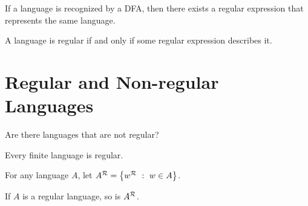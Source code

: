 \documentclass[twoside,letterpaper,openany]{book}
\begin{document}
\begin{lemma}
If a language is recognized by a DFA, then there exists a regular expression that represents the same language.
\end{lemma}

\begin{thm}
A language is regular if and only if some regular expression describes it.
\end{thm}

\clearpage

\section{Regular and Non-regular Languages}

\begin{discussion}
Are there languages that are not regular?
\end{discussion}


\begin{thm}
Every finite language is regular.
\end{thm}

\begin{defn}
For any language $A$, let $A^{\mathcal{R}} = \left\lbrace w^{\mathcal{R}}\ :\ w \in A \right\rbrace$. 
\end{defn}

\begin{thm}
If $A$ is a regular language, so is $A^{\mathcal{R}}$.
\end{thm}
\end{document}
